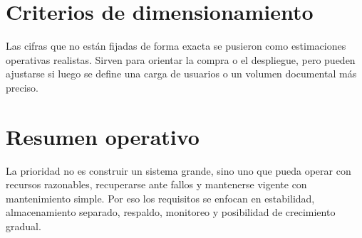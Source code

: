 \documentclass[12pt,a4paper]{report}
\begin{document}
\section*{Criterios de dimensionamiento}
Las cifras que no están fijadas de forma exacta se pusieron como estimaciones operativas realistas. Sirven para orientar la compra o el despliegue, pero pueden ajustarse si luego se define una carga de usuarios o un volumen documental más preciso.

\section*{Resumen operativo}
La prioridad no es construir un sistema grande, sino uno que pueda operar con recursos razonables, recuperarse ante fallos y mantenerse vigente con mantenimiento simple. Por eso los requisitos se enfocan en estabilidad, almacenamiento separado, respaldo, monitoreo y posibilidad de crecimiento gradual.
\end{document}

